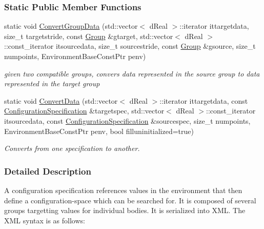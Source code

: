 \subsubsection*{Static Public Member Functions}
\begin{DoxyCompactItemize}
\item 
static void \hyperlink{classOpenRAVE_1_1ConfigurationSpecification_af710011f622dd73b9c7f6d5d1dc9f470}{ConvertGroupData} (std::vector$<$ dReal $>$::iterator ittargetdata, size\_\-t targetstride, const \hyperlink{classOpenRAVE_1_1ConfigurationSpecification_1_1Group}{Group} \&gtarget, std::vector$<$ dReal $>$::const\_\-iterator itsourcedata, size\_\-t sourcestride, const \hyperlink{classOpenRAVE_1_1ConfigurationSpecification_1_1Group}{Group} \&gsource, size\_\-t numpoints, EnvironmentBaseConstPtr penv)
\begin{DoxyCompactList}\small\item\em given two compatible groups, convers data represented in the source group to data represented in the target group \item\end{DoxyCompactList}\item 
static void \hyperlink{classOpenRAVE_1_1ConfigurationSpecification_a8f23d5a16201d23649d91061988091ea}{ConvertData} (std::vector$<$ dReal $>$::iterator ittargetdata, const \hyperlink{classOpenRAVE_1_1ConfigurationSpecification}{ConfigurationSpecification} \&targetspec, std::vector$<$ dReal $>$::const\_\-iterator itsourcedata, const \hyperlink{classOpenRAVE_1_1ConfigurationSpecification}{ConfigurationSpecification} \&sourcespec, size\_\-t numpoints, EnvironmentBaseConstPtr penv, bool filluninitialized=true)
\begin{DoxyCompactList}\small\item\em Converts from one specification to another. \item\end{DoxyCompactList}\end{DoxyCompactItemize}


\subsubsection{Detailed Description}
A configuration specification references values in the environment that then define a configuration-\/space which can be searched for. It is composed of several groups targetting values for individual bodies. It is serialized into XML. The XML syntax is as follows:


